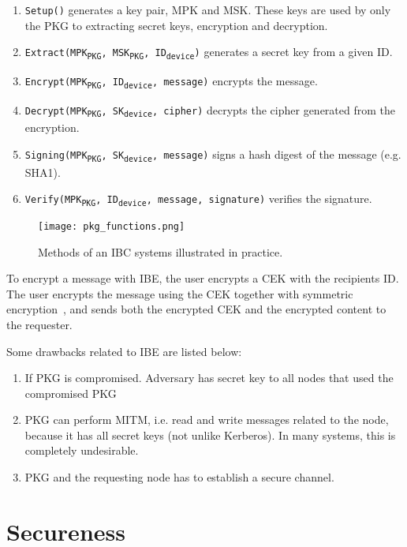 \begin{enumerate}\label{ibc-methods}
  \item \texttt{Setup()} generates a key pair, \gls{MPK} and \gls{MSK}. These keys are used by only the \gls{PKG} to extracting secret keys, encryption and decryption.
  \item \texttt{Extract(MPK\textsubscript{PKG}, MSK\textsubscript{PKG}, ID\textsubscript{device})} generates a secret key from a given ID. 
  \item \texttt{Encrypt(MPK\textsubscript{PKG}, ID\textsubscript{device}, message)} encrypts the message.
  \item \texttt{Decrypt(MPK\textsubscript{PKG}, SK\textsubscript{device}, cipher)} decrypts the cipher generated from the encryption.
  \item \texttt{Signing(MPK\textsubscript{PKG}, SK\textsubscript{device}, message)} signs a hash digest of the message (e.g. \gls{SHA1}).
  \item \texttt{Verify(MPK\textsubscript{PKG}, ID\textsubscript{device}, message, signature)} verifies the signature.
\end{enumerate}

\begin{figure}[ht]
  \centering
  \texttt{[image: pkg\_functions.png]}
  \caption{Methods of an IBC systems illustrated in practice.}
  \label{fig:pkg_functions}
\end{figure}

To encrypt a message with \gls{IBE}, the user encrypts a \gls{CEK} with the recipients \gls{ID}.
The user encrypts the message using the \gls{CEK} together with symmetric encryption~\cite[section 2.2.2]{rfc5408}, and sends both the encrypted \gls{CEK} and the encrypted content to the requester. 


Some drawbacks related to \gls{IBE} are listed below:
\begin{enumerate}
	\item If \gls{PKG} is compromised. Adversary has secret key to all nodes that used the compromised \gls{PKG}
	\item \gls{PKG} can perform \gls{MITM}, i.e. read and write messages related to the node, because it has all secret keys (not unlike Kerberos).
  In many systems, this is completely undesirable.
	\item \gls{PKG} and the requesting node has to establish a secure channel. 
\end{enumerate}

\section{Secureness}

